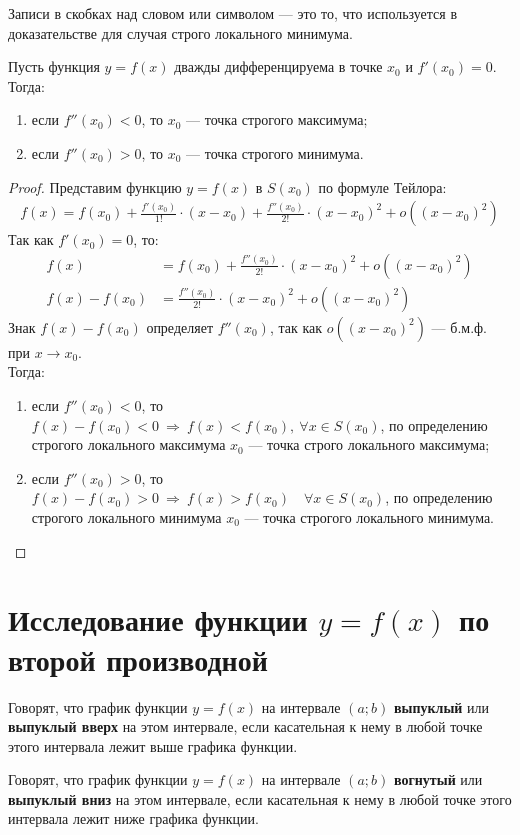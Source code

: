 \begin{note}
	Записи в скобках над словом или символом --- это то, что используется в доказательстве для случая строго локального минимума.
\end{note}
\newpage
\begin{theorem}
	Пусть функция $y=f(x)$ дважды дифференцируема в точке $x_0$ и $f'(x_0) = 0$. Тогда:
	\begin{enumerate}
		\item если $f''(x_0) < 0$, то $x_0$ --- точка строгого максимума;
		\item если $f''(x_0) > 0$, то $x_0$ --- точка строгого минимума.
	\end{enumerate}
\end{theorem}
\begin{proof}
	Представим функцию $y=f(x)$ в $S(x_0)$ по формуле Тейлора:
	\begin{align*}
		f(x) = f(x_0) + \frac{f'(x_0)}{1!}\cdot (x-x_0) +  \frac{f''(x_0)}{2!}\cdot (x-x_0)^2 + o\left((x-x_0)^2\right)
	\end{align*}
	Так как $f'(x_0) = 0$, то:
	\begin{align*}
		f(x)          & = f(x_0) + \frac{f''(x_0)}{2!}\cdot (x-x_0)^2 + o\left((x-x_0)^2\right) \\
		f(x) - f(x_0) & = \frac{f''(x_0)}{2!}\cdot (x-x_0)^2 + o\left((x-x_0)^2\right)
	\end{align*}
	Знак $f(x) - f(x_0)$ определяет $f''(x_0)$, так как $o\left((x-x_0)^2\right)$ --- б.м.ф. при $x\to x_0$.\\
	Тогда:
	\begin{enumerate}
		\item если $f''(x_0) < 0$, то $f(x) - f(x_0) < 0\ \Rightarrow\ f(x) < f(x_0),\ \forall x \in S(x_0)$, по определению строгого локального максимума $x_0$ --- точка строго локального максимума;
		\item если $f''(x_0) > 0$, то $f(x) - f(x_0) > 0\ \Rightarrow\ f(x) > f(x_0)\quad \forall x \in S(x_0)$, по определению строгого локального минимума $x_0$ --- точка строгого локального минимума.
	\end{enumerate}
\end{proof}
\zerocounter
\section{Исследование функции $y=f(x)$ по второй производной}
\begin{definition}
	Говорят, что график функции $y=f(x)$ на интервале $(a;b)$ \textbf{выпуклый} или \textbf{выпуклый вверх} на этом интервале, если касательная к нему в любой точке этого интервала лежит выше графика функции.
\end{definition}
\begin{definition}
	Говорят, что график функции $y=f(x)$ на интервале $(a;b)$ \textbf{вогнутый} или \textbf{выпуклый вниз} на этом интервале, если касательная к нему в любой точке этого интервала лежит ниже графика функции.
\end{definition}
